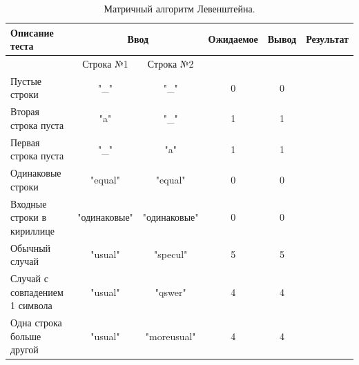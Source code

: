 \documentclass[12pt]{report}
\begin{document}
\begin{table}
	\caption{\label{tab:test2} Матричный алгоритм Левенштейна.}
	\begin{center}
		\begin{tabular}{|p{2.5cm}|c|c|c|c|c|}
			\hline
			Описание теста & \multicolumn{2}{|c|}{Ввод} & Ожидаемое & Вывод & Результат\\
			\hline
			& Строка №1 & Строка №2 & & & \\
			\hline
			Пустые строки & "\_" & "\_" & 0 & 0 & \checkmark\\
			\hline
			Вторая строка пуста & "a" & "\_" & 1 & 1 & \checkmark\\
			\hline
			Первая строка пуста & "\_" & "a" & 1 & 1 & \checkmark\\
			\hline
			Одинаковые строки & "equal" & "equal" & 0 & 0 & \checkmark\\
			\hline
			Входные строки в кириллице & "одинаковые" & "одинаковые" & 0 & 0 & \checkmark\\
			\hline
			Обычный случай & "usual" & "specul" & 5 & 5 & \checkmark\\
			\hline
			Случай с совпадением 1 символа & "usual" & "qswer" & 4 & 4 & \checkmark\\
			\hline
			Одна строка больше другой & "usual" & "moreusual" & 4 & 4 & \checkmark\\
			\hline
		\end{tabular}
	\end{center}
\end{table}
\end{document}
